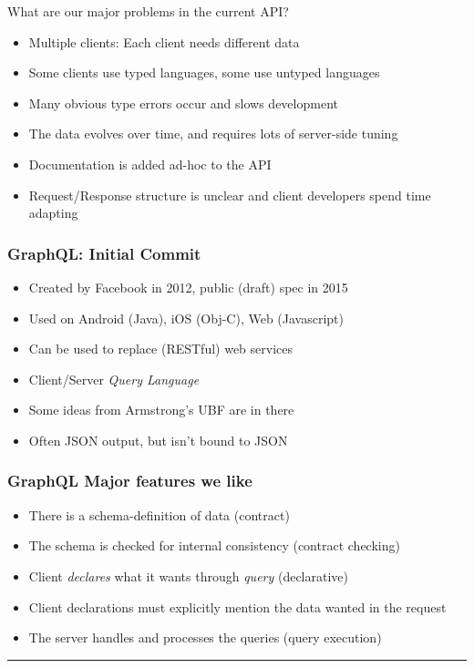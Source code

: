 \documentclass[lualatex]{beamer}
\begin{document}
\begin{frame}
  What are our major problems in the current API?
  \begin{itemize}
  \item Multiple clients: Each client needs different data
  \item Some clients use typed languages, some use untyped languages
  \item Many obvious type errors occur and slows development
  \item The data evolves over time, and requires lots of server-side
    tuning
  \item Documentation is added ad-hoc to the API
  \item Request/Response structure is unclear and client developers
    spend time adapting
  \end{itemize}
\end{frame}

\begin{frame}
  \frametitle{GraphQL: Initial Commit}
  \begin{itemize}
  \item Created by Facebook in 2012, public (draft) spec in 2015
  \item Used on Android (Java), iOS (Obj-C), Web (Javascript)
  \item Can be used to replace (RESTful) web services
  \item Client/Server \emph{Query Language}
  \item Some ideas from Armstrong's UBF are in there
  \item Often JSON output, but isn't bound to JSON
  \end{itemize}
\end{frame}

\begin{frame}
  \frametitle{GraphQL Major features we like}
  \begin{itemize}
  \item There is a schema-definition of data (contract)
  \item The schema is checked for internal consistency (contract checking)
  \item Client \emph{declares} what it wants through \emph{query}
    (declarative)
  \item Client declarations must explicitly mention the data wanted in
    the request
  \item The server handles and processes the queries (query execution)
  \end{itemize}
  \rule{\textwidth}{1pt}
\end{frame}
\end{document}
